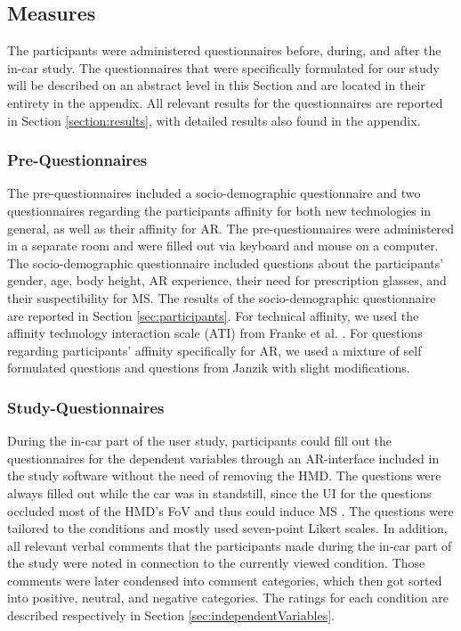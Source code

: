 \subsection{Measures}
\label{sec:measures}
The participants were administered questionnaires before, during, and after the in-car study. The questionnaires that were specifically formulated for our study will be described on an abstract level in this Section and are located in their entirety in the appendix. All relevant results for the questionnaires are reported in Section \ref{section:results}, with detailed results also found in the appendix.

\subsubsection*{\textbf{Pre-Questionnaires}}
The pre-questionnaires included a socio-demographic questionnaire and two questionnaires regarding the participants affinity for both new technologies in general, as well as their affinity for AR. The pre-questionnaires were administered in a separate room and were filled out via keyboard and mouse on a computer. 
The socio-demographic questionnaire included questions about the participants' gender, age, body height, AR experience, their need for prescription glasses, and their suspectibility for MS. The results of the socio-demographic questionnaire are reported in Section \ref{sec:participants}.
For technical affinity, we used the affinity technology interaction scale (ATI) from Franke et al. \cite{franke2019personal}. For questions regarding participants' affinity specifically for AR, we used a mixture of self formulated questions and questions from Janzik \cite{janzik2022studie} with slight modifications.


\subsubsection*{\textbf{Study-Questionnaires}}
During the in-car part of the user study, participants could fill out the questionnaires for the dependent variables through an AR-interface included in the study software without the need of removing the HMD. The questions were always filled out while the car was in standstill, since the UI for the questions occluded most of the HMD's FoV and thus could induce MS \cite{Sasalovici23ArMs}. The questions were tailored to the conditions and mostly used seven-point Likert scales. In addition, all relevant verbal comments that the participants made during the in-car part of the study were noted in connection to the currently viewed condition. Those comments were later condensed into comment categories, which then got sorted into positive, neutral, and negative categories. The ratings for each condition are described respectively in Section \ref{sec:independentVariables}.


